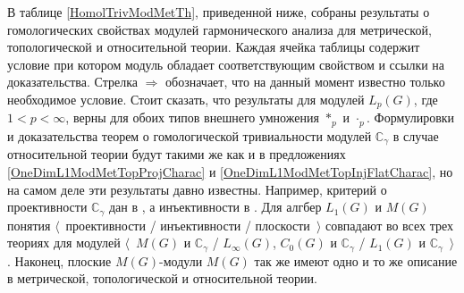 \documentclass{article}
\numberwithin{equation}{section}
\theoremstyle{plain}
\theoremstyle{definition}
\newcommand{\convol}{\ast}
\begin{document}
\begin{fulltext}
В таблице \ref{HomolTrivModMetTh}, приведенной ниже, собраны результаты о 
гомологических свойствах модулей гармонического анализа для метрической, 
топологической и относительной теории. Каждая ячейка таблицы содержит 
условие при котором модуль обладает соответствующим свойством и ссылки 
на доказательства. Стрелка $\Longrightarrow$ обозначает, что на данный 
момент известно только необходимое условие. Стоит сказать, что результаты 
для модулей $L_p(G)$, где $1<p<\infty$, верны для обоих типов внешнего 
умножения $\convol_p$ и $\cdot_p$. Формулировки и доказательства теорем о 
гомологической тривиальности модулей $\mathbb{C}_\gamma$ в случае 
относительной теории будут такими же как и в предложениях 
\ref{OneDimL1ModMetTopProjCharac} и \ref{OneDimL1ModMetTopInjFlatCharac}, 
но на самом деле эти результаты давно известны. Например, критерий о 
проективности $\mathbb{C}_\gamma$ дан в 
\cite[теорема~IV.5.13]{HelBanLocConvAlg}, а инъективности в 
\cite[теорема~2.5]{JohnCohomolBanAlg}. Для алгбер $L_1(G)$ и $M(G)$ 
понятия $\langle$~проективности / инъективности / плоскости~$\rangle$ 
совпадают во всех трех теориях для модулей $\langle$~$M(G)$ и 
$\mathbb{C}_\gamma$ / $L_\infty(G)$, $C_0(G)$ и $\mathbb{C}_\gamma$ / 
$L_1(G)$ и $\mathbb{C}_\gamma$~$\rangle$. Наконец, плоские $M(G)$-модули 
$M(G)$ так же имеют одно и то же описание в метрической, топологической 
и относительной теории.


\end{fulltext}
\end{document}
